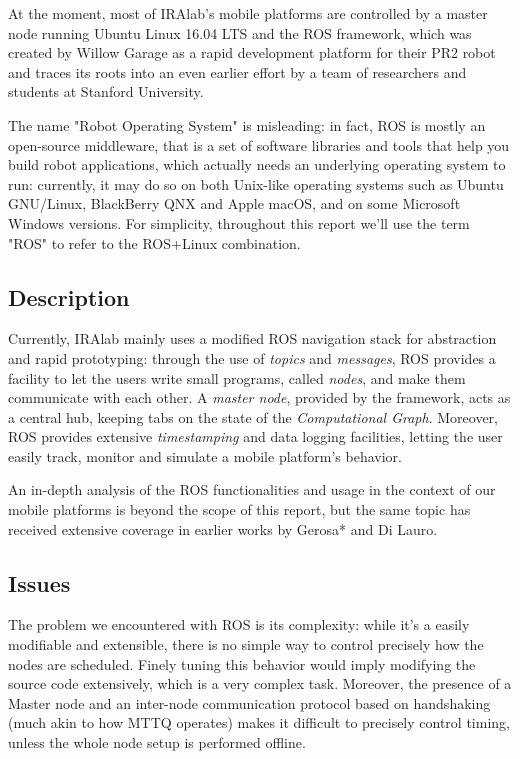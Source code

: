 \documentclass[a4paper,12pt]{report}
\begin{document}
At the moment, most of IRAlab's mobile platforms are controlled by a master node running Ubuntu Linux 16.04 LTS and the ROS framework, which was created by Willow Garage as a rapid development platform for their PR2 robot and traces its roots into an even earlier effort by a team of researchers and students at Stanford University. 

The name "Robot Operating System" is misleading: in fact, ROS is mostly an open-source middleware, that is a set of software libraries and tools that help you build robot applications, which actually needs an underlying operating system to run: currently, it may do so on both Unix-like operating systems such as Ubuntu GNU/Linux, BlackBerry QNX\cite{qnx-ros} and Apple macOS, and on some Microsoft Windows versions. For simplicity, throughout this report we'll use the term "ROS" to refer to the ROS+Linux combination.

\subsection{Description}

Currently, IRAlab mainly uses a modified ROS navigation stack for abstraction and rapid prototyping: through the use of \textit{topics} and \textit{messages}, ROS provides a facility to let the users write small programs, called \textit{nodes}, and make them communicate with each other. A \textit{master node}, provided by the framework, acts as a central hub, keeping tabs on the state of the \textit{Computational Graph}. Moreover, ROS provides extensive \textit{timestamping} and data logging facilities, letting the user easily track, monitor and simulate a mobile platform's behavior.

An in-depth analysis of the ROS functionalities and usage in the context of our mobile platforms is beyond the scope of this report, but the same topic has received extensive coverage in earlier works by Gerosa* and Di Lauro\cite{fdila-bs-otto}.

\subsection{Issues}

The problem we encountered with ROS is its complexity: while it's a easily modifiable and extensible, there is no simple way to control precisely how the nodes are scheduled. Finely tuning this behavior would imply modifying the source code extensively, which is a very complex task.  Moreover, the presence of a Master node and an inter-node communication protocol based on handshaking (much akin to how MTTQ operates) makes it difficult to precisely control timing, unless the whole node setup is performed offline.
\end{document}
